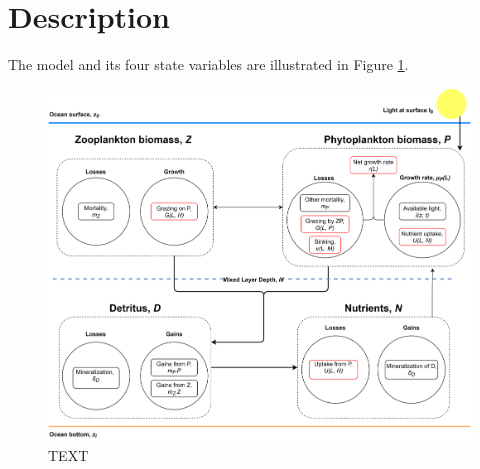 \section{Description}
The model and its four state variables are illustrated in Figure \cref{fig:ModelIllust}.
\begin{figure}[H]
\centering
\includegraphics[width=.90\linewidth]{Figures/ModelIllustration_HighRes1.png}
\caption{TEXT}
\label{fig:ModelIllust}
\end{figure}
\newpage
%
